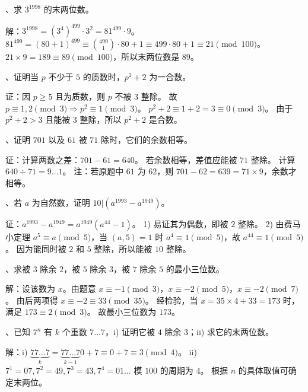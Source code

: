\begin{questions}
、求 $3^{1998}$ 的末两位数。

\begin{solution}
解：$3^{1998} = (3^4)^{499} \cdot 3^2 = 81^{499} \cdot 9$。
$81^{499} = (80 + 1)^{499} \equiv \binom{499}{1} \cdot 80 + 1 \equiv 499 \cdot 80 + 1 \equiv 21 \pmod{100}$。
$21 \times 9 = 189 \equiv 89 \pmod{100}$，所以末两位数是 $89$。
\end{solution}

、证明当 $p$ 不少于 $5$ 的质数时，$p^2 + 2$ 为一合数。

\begin{solution}
证：因 $p \ge 5$ 且为质数，则 $p$ 不被 $3$ 整除。
故 $p \equiv 1, 2 \pmod 3 \Rightarrow p^2 \equiv 1 \pmod 3$。
$p^2 + 2 \equiv 1 + 2 = 3 \equiv 0 \pmod 3$。
由于 $p^2 + 2 > 3$ 且能被 $3$ 整除，所以 $p^2 + 2$ 是合数。
\end{solution}

、证明 $701$ 以及 $61$ 被 $71$ 除时，它们的余数相等。

\begin{solution}
证：计算两数之差：$701 - 61 = 640$。
若余数相等，差值应能被 $71$ 整除。
计算 $640 \div 71 = 9 \dots 1$。
注：若原题中 $61$ 为 $62$，则 $701-62=639=71 \times 9$，余数才相等。
\end{solution}

、若 $a$ 为自然数，证明 $10 | (a^{1993} - a^{1949})$。

\begin{solution}
证：$a^{1993} - a^{1949} = a^{1949}(a^{44} - 1)$。
1) 易证其为偶数，即被 $2$ 整除。
2) 由费马小定理 $a^5 \equiv a \pmod 5$，当 $(a, 5)=1$ 时 $a^4 \equiv 1 \pmod 5$，故 $a^{44} \equiv 1 \pmod 5$。
因为能同时被 $2$ 和 $5$ 整除，所以能被 $10$ 整除。
\end{solution}

、求被 $3$ 除余 $2$，被 $5$ 除余 $3$，被 $7$ 除余 $5$ 的最小三位数。

\begin{solution}
解：设该数为 $x$。由题意 $x \equiv -1 \pmod 3$，$x \equiv -2 \pmod 5$，$x \equiv -2 \pmod 7$。
由后两项得 $x \equiv -2 \equiv 33 \pmod{35}$。
经检验，当 $x = 35 \times 4 + 33 = 173$ 时，满足 $173 \equiv 2 \pmod 3$。
故最小三位数为 $173$。
\end{solution}

、已知 $7^n$ 有 $k$ 个重数 $7 \dots 7$，i) 证明它被 $4$ 除余 $3$；ii) 求它的末两位数。

\begin{solution}
解：i) $\underbrace{77\dots7}_{k} = \underbrace{77\dots7}_{k-1}0 + 7 \equiv 0 + 7 \equiv 3 \pmod 4$。
ii) $7^1=07, 7^2=49, 7^3=43, 7^4=01 \dots$ 模 $100$ 的周期为 $4$。
根据 $n$ 的具体取值可确定末两位。
\end{solution}


\end{questions}
